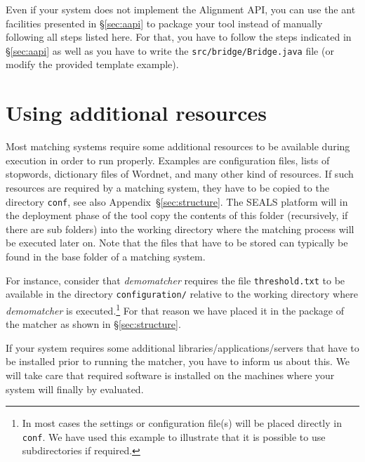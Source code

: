 \documentclass{article}
\def\file#1{\textcolor{grayy}{\texttt{#1}}}
\def\tool#1{\textsl{#1}}
\begin{document}
Even if your system does not implement the Alignment API, you can use the ant facilities presented in \S\ref{sec:aapi} to package your tool instead of manually following all steps listed here. For that, you have to follow the steps indicated in \S\ref{sec:aapi} as well as you have to write the \file{src/bridge/Bridge.java} file (or modify the provided template example).

\section{Using additional resources}
\label{sec:resources}

Most matching systems require some additional resources to be available during execution in order to run properly. Examples are configuration files, lists of stopwords, dictionary files of Wordnet, and many other kind of resources. If such resources are required by a matching system, they have to be copied to the directory \file{conf}, see also Appendix~\S\ref{sec:structure}. The SEALS platform will in the deployment phase of the tool copy the contents of this folder (recursively, if there are sub folders) into the working directory where the matching process will be executed later on. Note that the files that have to be stored can typically be found in the base folder of a matching system. 

For instance, consider that \tool{demomatcher} requires the file \file{threshold.txt} to be available in the directory \file{configuration/} relative to the working directory where \tool{demomatcher} is executed.\footnote{In most cases the settings or configuration file(s) will be placed directly in \file{conf}. We have used this example to illustrate that it is possible to use subdirectories if required.} For that reason we have placed it in the package of the matcher as shown in \S\ref{sec:structure}. 

If your system requires some additional libraries/applications/servers that have to be installed prior to running the matcher, you have to inform us about this. We will take care that required software is installed on the machines where your system will finally by evaluated.
\end{document}
